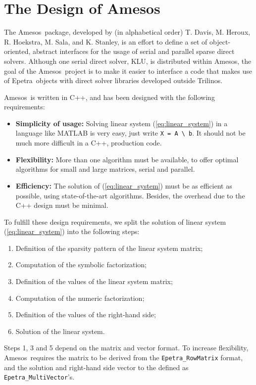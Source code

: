 \documentclass[11pt]{SANDreport}
\newcommand{\epetra}{{\sc Epetra}}
\newcommand{\amesos}{{\sc Amesos}}
\newcommand{\trilinos}{{\sc Trilinos}}
\begin{document}
\clearpage

\SANDmain


\tableofcontents

\clearpage

\section{The Design of \amesos}
\label{sec:intro}

The \amesos\ package, developed by (in alphabetical order) T. Davis, 
M. Heroux, R. Hoekstra, M. Sala, and K. Stanley, is an effort to define a set
of object-oriented, abstract interfaces for the usage of serial and 
parallel sparse direct solvers. Although one serial direct solver, KLU, 
  is distributed within \amesos, the goal of the \amesos\ project is to make
  it easier to interface a code that makes use of \epetra\ objects with
  direct solver libraries developed outside \trilinos.

\amesos\ is written in C++, and has been designed with the
following requirements:
\begin{itemize}
\item {\bf Simplicity of usage:} Solving linear system (\ref{eq:linear_system}) in a language
like MATLAB is very easy, just write \verb!X = A \ b!. It should not be much
more difficult in a C++, production code.
\item {\bf Flexibility:} More than one algorithm must be available, 
  to offer optimal algorithms for small and large matrices, serial and
  parallel.
\item {\bf Efficiency:} The solution of (\ref{eq:linear_system}) must be as
efficient as possible, using state-of-the-art algorithms. Besides, the
overhead due to the C++ design must be minimal.
\end{itemize}

To fulfill these design requirements, we split the solution
of linear system (\ref{eq:linear_system}) into the
following steps:
\begin{enumerate}
\item Definition of the sparsity pattern of the linear system matrix;
\item Computation of the symbolic factorization;
\item Definition of the values of the linear system matrix;
\item Computation of the numeric factorization;
\item Definition of the values of the right-hand side;
\item Solution of the linear system.
\end{enumerate}
Steps 1, 3 and 5 depend on the matrix and vector format. To increase
flexibility, \amesos\ requires the
matrix to be derived from the \verb!Epetra_RowMatrix! format, and the solution
and right-hand side vector to the defined as \verb!Epetra_MultiVector!'s.
\end{document}
